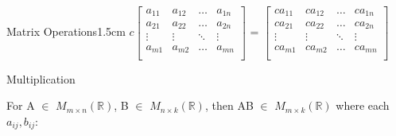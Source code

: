 \begin{ltheorem}{Matrix Operations}{1.5cm}
            {\footnotesize
            $c
            \begin{bmatrix}
                a_{11} & a_{12} & \hdots & a_{1n} \\
                a_{21} & a_{22} & \hdots & a_{2n} \\
                \vdots & \vdots & \ddots & \vdots \\
                a_{m1} & a_{m2} & \hdots & a_{mn} \\
            \end{bmatrix}$
            =
            $
            \begin{bmatrix}
                ca_{11} & ca_{12} & \hdots & ca_{1n} \\
                ca_{21} & ca_{22} & \hdots & ca_{2n} \\
                \vdots & \vdots & \ddots & \vdots \\
                ca_{m1} & ca_{m2} & \hdots & ca_{mn} \\
            \end{bmatrix}
            $}
        
        \item Multiplication
        
            For A $\in$ $M_{m \times n}(\mathbb{R})$,
            B $\in$ $M_{n \times k}(\mathbb{R})$,
            then AB $\in$ $M_{m \times k}(\mathbb{R})$
            where each $a_{ij},b_{ij}$:
            

\end{ltheorem}
